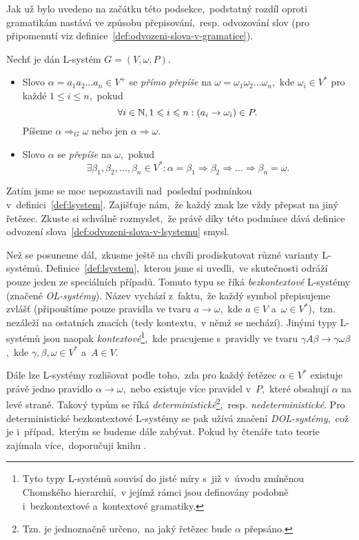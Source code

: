 Jak už bylo uvedeno na začátku této podsekce,~podstatný rozdíl oproti gramatikám nastává ve způsobu přepisování,~resp. odvozování slov (pro připomenutí viz definice~\ref{def:odvozeni-slova-v-gramatice}).
\begin{definition}\label{def:odvozeni-slova-v-lsystemu}
    Nechť je dán L-systém $G=(V,\omega,P)$.
    \begin{itemize}
        \item Slovo $\alpha=a_1a_2\ldots a_n\in V^+$ se \emph{přímo přepíše} na $\omega=\omega_1\omega_2\ldots\omega_n$,~kde $\omega_i\in V^*$ pro každé $1\leqslant i\leqslant n$,~pokud
        \[\forall i\in\mathbb{N},1\leqslant i\leqslant n: (a_i\to\omega_i)\in P.\]
        Píšeme $\alpha\Rightarrow_G\omega$ nebo jen $\alpha\Rightarrow\omega$.
        \item Slovo $\alpha$ se \emph{přepíše} na $\omega$,~pokud
        \[\exists\beta_1,\beta_2,\ldots,\beta_n\in V^*:\alpha=\beta_1\Rightarrow\beta_2\Rightarrow\dots\Rightarrow\beta_n=\omega.\]
    \end{itemize}
\end{definition}
Zatím jsme se moc nepozastavili nad~poslední podmínkou v~definici~\ref{def:lsystem}. Zajišťuje nám,~že každý znak lze vždy přepsat na jiný řetězec. Zkuste si schválně rozmyslet,~že právě díky této podmínce dává definice odvození slova~\ref{def:odvozeni-slova-v-lsystemu} smysl.

Než se posuneme dál,~zkusme ještě na chvíli prodiskutovat různé varianty L-systémů. Definice~\ref{def:lsystem},~kterou jsme si uvedli,~ve skutečnosti odráží pouze jeden ze speciálních případů. Tomuto typu se říká \emph{bezkontextové} L-systémy (značené \emph{OL-systémy}). Název vychází z~faktu,~že každý symbol přepisujeme zvlášť (připouštíme pouze pravidla ve tvaru $a\to\omega$,~kde $a\in V$ a~$\omega\in V^*$),~tzn. nezáleží na ostatních znacích (tedy kontextu,~v němž se nechází). Jinými typy L-systémů jsou naopak \emph{kontextové}\footnote{Tyto typy L-systémů souvisí do jisté míry s~již v~úvodu zmíněnou Chomského hierarchií,~v jejímž rámci jsou definovány podobně i~bezkontextové a~kontextové gramatiky.},~kde pracujeme s~pravidly ve tvaru $\gamma A\beta\to\gamma\omega\beta$,~kde $\gamma,\beta,\omega\in V^*$ a~$A\in V$.

Dále lze L-systémy rozlišovat podle toho,~zda pro každý řetězec $\alpha\in V^*$ existuje právě jedno pravidlo $\alpha\to\omega$,~nebo existuje více pravidel v~$P$,~které obsahují $\alpha$ na levé straně. Takový typům se říká \emph{deterministické}\footnote{Tzn. je jednoznačně určeno,~na jaký řetězec bude $\alpha$ přepsáno.},~resp. \emph{nedeterministické}. Pro deterministické bezkontextové L-systémy se pak užívá značení \emph{DOL-systémy},~což je i~případ,~kterým se budeme dále zabývat. Pokud by čtenáře tato teorie zajímala více,~doporučuji knihu \cite{Prusinkiewicz1990}.

